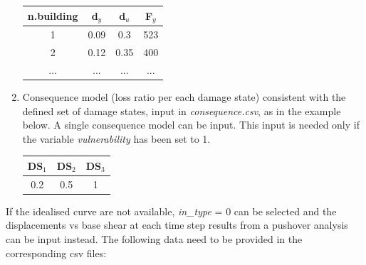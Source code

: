 \begin{enumerate}
\begin{table}[H]
\centering
\begin{tabular}{|c|c|c|c|} \hline
\textbf{n.building} & \textbf{d$_y$} & \textbf{d$_u$} & \textbf{F$_y$} \\ \hline
1 & 0.09	& 0.3	 & 523\\ \hline
2 & 0.12	& 0.35	 & 400\\ \hline
... & ...	& ... & ...\\ \hline
\end{tabular}
\end{table}

\item Consequence model (loss ratio per each damage state) consistent with the defined set of damage states, input in \textit{consequence.csv}, as in the example below. A single consequence model can be input. This input is needed only if the variable \textit{vulnerability} has been set to 1.	
	\begin{table}[H]
	\centering
	\begin{tabular}{|c|c|c|} \hline
	\textbf{DS$_1$} & \textbf{DS$_2$} & \textbf{DS$_3$} \\ \hline
	0.2	& 0.5	 & 1\\ \hline
	\end{tabular}
	\end{table}
	
\end{enumerate}

If the idealised curve are not available, \textit{in\_type} = 0 can be selected and the displacements vs base shear at each time step results from a pushover analysis can be input instead. The following data need to be provided in the corresponding csv files:

